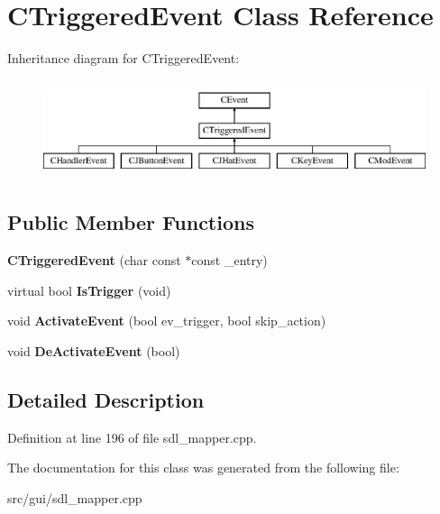 \hypertarget{classCTriggeredEvent}{\section{C\-Triggered\-Event Class Reference}
\label{classCTriggeredEvent}
}
Inheritance diagram for C\-Triggered\-Event\-:\begin{figure}[H]
\begin{center}
\leavevmode
\includegraphics[height=2.896552cm]{classCTriggeredEvent}
\end{center}
\end{figure}
\subsection*{Public Member Functions}
\begin{DoxyCompactItemize}
\item 
\hypertarget{classCTriggeredEvent_ac9f3fc82121e3632950dfd89e37fc90d}{{\bfseries C\-Triggered\-Event} (char const $\ast$const \-\_\-entry)}\label{classCTriggeredEvent_ac9f3fc82121e3632950dfd89e37fc90d}

\item 
\hypertarget{classCTriggeredEvent_a4ab6cb9bc929db0b4281218ff1205cb6}{virtual bool {\bfseries Is\-Trigger} (void)}\label{classCTriggeredEvent_a4ab6cb9bc929db0b4281218ff1205cb6}

\item 
\hypertarget{classCTriggeredEvent_ab438d4c740739216ae049088f887e6bb}{void {\bfseries Activate\-Event} (bool ev\-\_\-trigger, bool skip\-\_\-action)}\label{classCTriggeredEvent_ab438d4c740739216ae049088f887e6bb}

\item 
\hypertarget{classCTriggeredEvent_a14ad33e00067cce7d4a9266888e24192}{void {\bfseries De\-Activate\-Event} (bool)}\label{classCTriggeredEvent_a14ad33e00067cce7d4a9266888e24192}

\end{DoxyCompactItemize}


\subsection{Detailed Description}


Definition at line 196 of file sdl\-\_\-mapper.\-cpp.



The documentation for this class was generated from the following file\-:\begin{DoxyCompactItemize}
\item 
src/gui/sdl\-\_\-mapper.\-cpp\end{DoxyCompactItemize}
